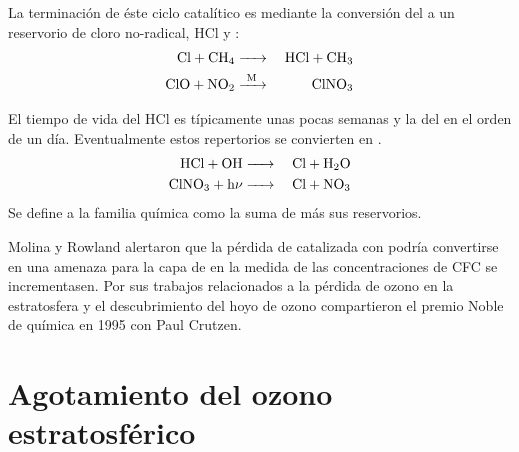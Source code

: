 La terminación de éste ciclo catalítico es mediante la conversión del  a un reservorio de cloro no-radical, HCl y :
\begin{eqnarray*}
 \ce{Cl + CH4   & ->   & HCl + CH3 \\
       ClO + NO2        &  ->[M]  & ClNO3}
\end{eqnarray*}

El tiempo de vida del HCl es típicamente unas pocas semanas y la del  en el orden de un día. Eventualmente estos repertorios se convierten en .
\begin{eqnarray*}
 \ce{HCl + OH   & ->   & Cl + H2O \\
       ClNO3 +   h$\nu$   &  ->  & Cl + NO3}
\end{eqnarray*}
Se define a la familia química  como la suma de  más sus reservorios.

Molina y Rowland alertaron que la pérdida de   catalizada con   podría convertirse en una amenaza para la capa de   en la medida de las concentraciones de CFC se incrementasen. Por sus trabajos relacionados a la pérdida de ozono en la estratosfera y el descubrimiento del hoyo de ozono compartieron el premio Noble de química en 1995 con Paul Crutzen.

\section{Agotamiento del ozono estratosférico}

